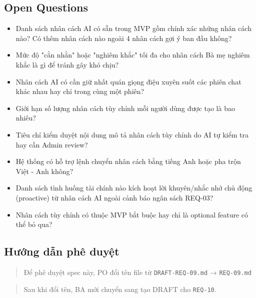 \subsection{Open Questions}

\begin{itemize}
\item [ ] Danh sách nhân cách AI có sẵn trong MVP gồm chính xác những nhân cách nào? Có thêm nhân cách nào ngoài 4 nhân cách gợi ý ban đầu không?
\item [ ] Mức độ "cằn nhằn" hoặc "nghiêm khắc" tối đa cho nhân cách Bà mẹ nghiêm khắc là gì để tránh gây khó chịu?
\item [ ] Nhân cách AI có cần giữ nhất quán giọng điệu xuyên suốt các phiên chat khác nhau hay chỉ trong cùng một phiên?
\item [ ] Giới hạn số lượng nhân cách tùy chỉnh mỗi người dùng được tạo là bao nhiêu?
\item [ ] Tiêu chí kiểm duyệt nội dung mô tả nhân cách tùy chỉnh do AI tự kiểm tra hay cần Admin review?
\item [ ] Hệ thống có hỗ trợ lệnh chuyển nhân cách bằng tiếng Anh hoặc pha trộn Việt - Anh không?
\item [ ] Danh sách tình huống tài chính nào kích hoạt lời khuyên/nhắc nhở chủ động (proactive) từ nhân cách AI ngoài cảnh báo ngân sách REQ-03?
\item [ ] Nhân cách tùy chỉnh có thuộc MVP bắt buộc hay chỉ là optional feature có thể bỏ qua?
\end{itemize}
\subsection{Hướng dẫn phê duyệt}

\begin{quote}
Để phê duyệt spec này, PO đổi tên file từ \texttt{DRAFT-REQ-09.md} → \texttt{REQ-09.md}
\end{quote}

\begin{quote}
Sau khi đổi tên, BA mới chuyển sang tạo DRAFT cho \texttt{REQ-10}.
\end{quote}
